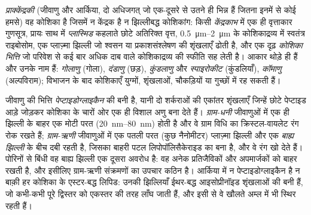 \begin{definition}[प्राक्केंद्रकी कोशिका]\label{def:b2:unicellular-diversity:prokaryote}
\emph{प्राक्केंद्रकी} (जीवाणु और आर्किया, दो
अधिजगत् जो एक-दूसरे से उतने ही भिन्न हैं जितना इनमें से कोई हमसे) वह
कोशिका है जिसमें न केंद्रक है न झिल्लीबद्ध कोशिकांग: किसी
\emph{केंद्रकाभ} में एक ही वृत्ताकार गुणसूत्र, प्रायः
साथ में \emph{प्लास्मिड} कहलाते छोटे अतिरिक्त वृत्त,
\qtyrange{0.5}{2}{\micro m} के कोशिकाद्रव्य में स्वतंत्र राइबोसोम, एक
प्लाज़्मा झिल्ली जो श्वसन या प्रकाशसंश्लेषण की शृंखलाएँ ढोती है, और एक
दृढ़ \emph{कोशिका भित्ति} जो परिवेश से
कई बार अधिक दाब वाले कोशिकाद्रव्य की स्फीति सह लेती है। आकार थोड़े ही
हैं और उनके नाम हैं: \emph{गोलाणु} (गोला), \emph{दंडाणु} (छड़),
\emph{कुंडलाणु} और \emph{स्पाइरोकीट} (कुंडलियाँ), \emph{कॉमाणु}
(अल्पविराम); विभाजन के बाद कोशिकाएँ युग्मों, शृंखलाओं, चौकड़ियों या
गुच्छों में रह सकती हैं।
\end{definition}

\begin{proposition}[दो आवरण: ग्राम-धनी और ग्राम-ऋणी]\label{prop:b2:unicellular-diversity:gram}
जीवाणु की भित्ति \emph{पेप्टाइडोग्लाइकैन} की बनी है, यानी दो शर्कराओं की
एकांतर शृंखलाएँ जिन्हें छोटे पेप्टाइड आड़े जोड़कर कोशिका के चारों ओर एक
ही विशाल अणु बना देते हैं। \emph{ग्राम-धनी} जीवाणुओं में एक ही झिल्ली के
बाहर एक मोटी परत (\qtyrange{20}{80}{nm}) होती है और वे ग्राम विधि का
क्रिस्टल-वायलेट रंग रोक रखते हैं; \emph{ग्राम-ऋणी} जीवाणुओं में एक पतली
परत (कुछ नैनोमीटर) प्लाज़्मा झिल्ली और एक \emph{बाह्य झिल्ली} के बीच दबी
रहती है, जिसका बाहरी पटल लिपोपॉलिसैकेराइड का बना है, और वे रंग खो देते
हैं। पोरिनों से बिंधी वह बाह्य झिल्ली एक दूसरा अवरोध है: वह अनेक
प्रतिजैविकों और अपमार्जकों को बाहर रखती है, और इसीलिए ग्राम-ऋणी संक्रमणों
का उपचार कठिन है। आर्किया में न पेप्टाइडोग्लाइकैन है न बाक़ी हर कोशिका के
एस्टर-बद्ध लिपिड: उनकी झिल्लियाँ ईथर-बद्ध आइसोप्रीनॉइड शृंखलाओं की बनी
हैं, जो कभी-कभी पूरे द्विस्तर को एकस्तर की तरह लाँघ जाती हैं, और इसी से
वे खौलते अम्ल में भी स्थिर रहती हैं।
\end{proposition}

